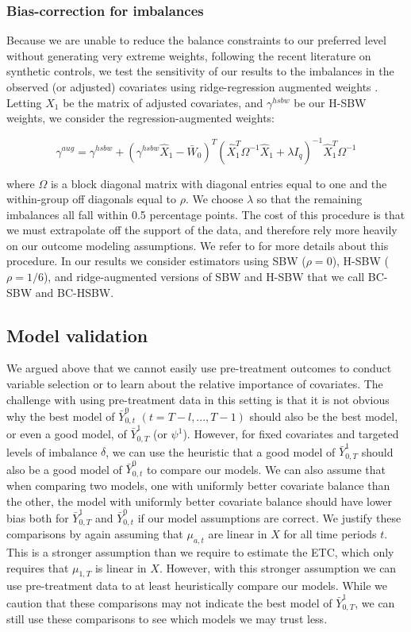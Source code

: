 \documentclass[article]{imsart}
\theoremstyle{plain}
\theoremstyle{remark}
\begin{document}
\subsubsection{Bias-correction for imbalances}

Because we are unable to reduce the balance constraints to our preferred level without generating very extreme weights, following the recent literature on synthetic controls, we test the sensitivity of our results to the imbalances in the observed (or adjusted) covariates using ridge-regression augmented weights \cite{ben2018augmented}. Letting $\hat{X}_1$ be the matrix of adjusted covariates, and $\gamma^{hsbw}$ be our H-SBW weights, we consider the regression-augmented weights:

\begin{equation}
\gamma^{aug} = \gamma^{hsbw} + (\gamma^{hsbw}\hat{X}_1 - \bar{W}_0)^T(\hat{X}_1^T\Omega^{-1}\hat{X}_1 + \lambda I_q)^{-1}\hat{X}_1^T\Omega^{-1}
\end{equation}

where $\Omega$ is a block diagonal matrix with diagonal entries equal to one and the within-group off diagonals equal to $\rho$. We choose $\lambda$ so that the remaining imbalances all fall within 0.5 percentage points. The cost of this procedure is that we must extrapolate off the support of the data, and therefore rely more heavily on our outcome modeling assumptions. We refer to \cite{ben2018augmented} for more details about this procedure. In our results we consider estimators using SBW ($\rho = 0$), H-SBW ($\rho = 1/6$), and ridge-augmented versions of SBW and H-SBW that we call BC-SBW and BC-HSBW. 

\subsection{Model validation}

We argued above that we cannot easily use pre-treatment outcomes to conduct variable selection or to learn about the relative importance of covariates. The challenge with using pre-treatment data in this setting is that it is not obvious why the best model of $\bar{Y}_{0, t}^0$ $(t = T-l,..., T-1)$ should also be the best model, or even a good model, of $\bar{Y}^1_{0,T}$ (or $\psi^1$). However, for fixed covariates and targeted levels of imbalance $\delta$, we can use the heuristic that a good model of $\bar{Y}^1_{0,T}$ should also be a good model of $\bar{Y}_{0, t}^0$ to compare our models. We can also assume that when comparing two models, one with uniformly better covariate balance than the other, the model with uniformly better covariate balance should have lower bias both for $\bar{Y}_{0, T}^1$ and $\bar{Y}_{0, t}^0$ if our model assumptions are correct. We justify these comparisons by again assuming that $\mu_{a, t}$ are linear in $X$ for all time periods $t$. This is a stronger assumption than we require to estimate the ETC, which only requires that $\mu_{1, T}$ is linear in $X$. However, with this stronger assumption we can use pre-treatment data to at least heuristically compare our models. While we caution that these comparisons may not indicate the best model of $\bar{Y}^1_{0,T}$, we can still use these comparisons to see which models we may trust less.
\end{document}
